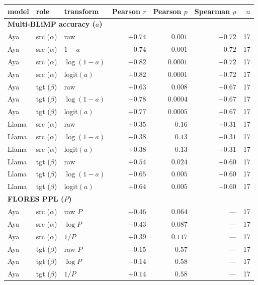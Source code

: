 \documentclass[11pt]{article}
\begin{document}
\begin{table}[h]
\centering
\small
\begin{tabular}{lllrrrr}
\toprule
model & role & transform & Pearson $r$ & Pearson $p$ & Spearman $\rho$ & $n$ \\
\midrule
\multicolumn{7}{l}{\textbf{Multi-BLiMP accuracy ($a$)}} \\
Aya   & src ($\alpha$) & raw       & $+0.74$ & $0.001$  & $+0.72$ & 17 \\
Aya   & src ($\alpha$) & $1-a$     & $-0.74$ & $0.001$  & $-0.72$ & 17 \\
Aya   & src ($\alpha$) & $\log(1-a)$ & $-0.82$ & $0.0001$ & $-0.72$ & 17 \\
Aya   & src ($\alpha$) & logit$(a)$  & $+0.82$ & $0.0001$ & $+0.72$ & 17 \\
Aya   & tgt ($\beta$)  & raw       & $+0.63$ & $0.008$  & $+0.67$ & 17 \\
Aya   & tgt ($\beta$)  & $\log(1-a)$ & $-0.78$ & $0.0004$ & $-0.67$ & 17 \\
Aya   & tgt ($\beta$)  & logit$(a)$  & $+0.77$ & $0.0005$ & $+0.67$ & 17 \\
Llama & src ($\alpha$) & raw       & $+0.35$ & $0.16$   & $+0.31$ & 17 \\
Llama & src ($\alpha$) & $\log(1-a)$ & $-0.38$ & $0.13$   & $-0.31$ & 17 \\
Llama & src ($\alpha$) & logit$(a)$  & $+0.38$ & $0.13$   & $+0.31$ & 17 \\
Llama & tgt ($\beta$)  & raw       & $+0.54$ & $0.024$  & $+0.60$ & 17 \\
Llama & tgt ($\beta$)  & $\log(1-a)$ & $-0.65$ & $0.005$  & $-0.60$ & 17 \\
Llama & tgt ($\beta$)  & logit$(a)$  & $+0.64$ & $0.005$  & $+0.60$ & 17 \\
\midrule
\multicolumn{7}{l}{\textbf{FLORES PPL ($P$)}} \\
Aya   & src ($\alpha$) & raw $P$     & $-0.46$ & $0.064$ & --- & 17 \\
Aya   & src ($\alpha$) & $\log P$    & $-0.43$ & $0.087$ & --- & 17 \\
Aya   & src ($\alpha$) & $1/P$       & $+0.39$ & $0.117$ & --- & 17 \\
Aya   & tgt ($\beta$)  & raw $P$     & $-0.15$ & $0.57$  & --- & 17 \\
Aya   & tgt ($\beta$)  & $\log P$    & $-0.14$ & $0.58$  & --- & 17 \\
Aya   & tgt ($\beta$)  & $1/P$       & $+0.14$ & $0.58$  & --- & 17 \\

\end{tabular}
\end{table}
\end{document}
